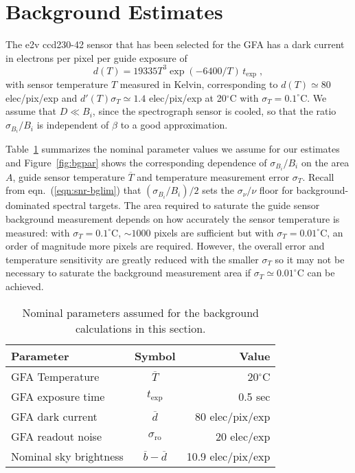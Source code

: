 \documentclass[11pt]{article}
\providecommand{\eqn}[1]{eqn.~(\ref{eqn:#1})}
\providecommand{\tab}[1]{Table~\ref{tab:#1}}
\providecommand{\fig}[1]{Figure~\ref{fig:#1}}
\begin{document}
\section{Background Estimates}

The e2v ccd230-42 sensor that has been selected for the GFA has a dark current in electrons per pixel per guide exposure of
\begin{equation}
d(T) = 19335 T^3 \exp(-6400/T)\,t_{\text{exp}} \; ,
\end{equation}
with sensor temperature $T$ measured in Kelvin, corresponding to $d(T) \simeq 80$ elec/pix/exp and $d'(T)\sigma_T \simeq 1.4$ elec/pix/exp at 20$^\circ$C with $\sigma_T = 0.1^\circ$C. We assume that $D \ll B_i$, since the spectrograph sensor is cooled, so that the ratio $\sigma_{B_i}/B_i$ is independent of $\beta$ to a good approximation.

\tab{bgpar} summarizes the nominal parameter values we assume for our estimates and \fig{bgpar} shows the corresponding dependence of $\sigma_{B_i}/B_i$ on the area $A$, guide sensor temperature $\overline{T}$ and temperature measurement error $\sigma_T$. Recall from \eqn{snr-bglim} that $(\sigma_{B_i}/B_i)/2$ sets the $\sigma_{\nu}/\nu$ floor for background-dominated spectral targets. The area required to saturate the guide sensor background measurement depends on how accurately the sensor temperature is measured: with $\sigma_T = 0.1^\circ$C, $\sim 1000$ pixels are sufficient but with $\sigma_T = 0.01^\circ$C, an order of magnitude more pixels are required. However, the overall error and temperature sensitivity are greatly reduced with the smaller $\sigma_T$ so it may not be necessary to saturate the background measurement area if $\sigma_T \simeq 0.01^\circ$C can be achieved.

\begin{table}[htb]
\begin{center}
\begin{tabular}{lcr}
Parameter & Symbol & Value \\
\hline
GFA Temperature & $\overline{T}$ & 20$^\circ$C \\
GFA exposure time & $t_{\text{exp}}$ & 0.5 sec \\
GFA dark current & $\overline{d}$ & 80 elec/pix/exp \\
GFA readout noise & $\sigma_{\text{ro}}$ & 20 elec/exp \\
Nominal sky brightness & $\overline{b} - \overline{d}$ & 10.9 elec/pix/exp \\
\hline
\end{tabular}
\end{center}
\caption{Nominal parameters assumed for the background calculations in this section.}
\label{tab:bgpar}
\end{table}
\end{document}
